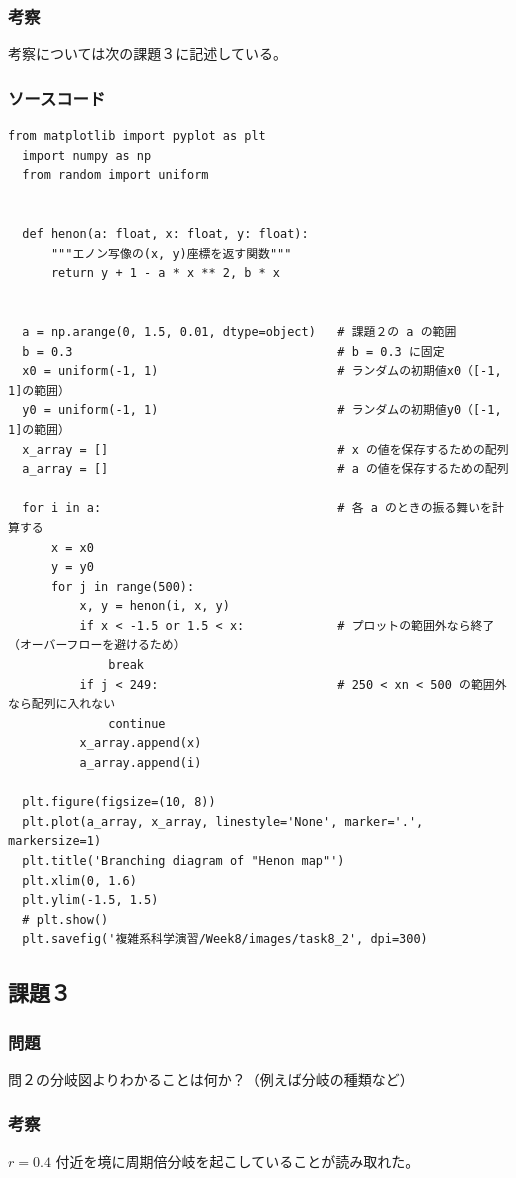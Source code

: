 \subsubsection{考察}
考察については次の課題３に記述している。

\subsubsection{ソースコード}
\begin{lstlisting}[caption=task8-2.py]
  from matplotlib import pyplot as plt
  import numpy as np
  from random import uniform


  def henon(a: float, x: float, y: float):
      """エノン写像の(x, y)座標を返す関数"""
      return y + 1 - a * x ** 2, b * x


  a = np.arange(0, 1.5, 0.01, dtype=object)   # 課題２の a の範囲
  b = 0.3                                     # b = 0.3 に固定
  x0 = uniform(-1, 1)                         # ランダムの初期値x0（[-1, 1]の範囲）
  y0 = uniform(-1, 1)                         # ランダムの初期値y0（[-1, 1]の範囲）
  x_array = []                                # x の値を保存するための配列
  a_array = []                                # a の値を保存するための配列

  for i in a:                                 # 各 a のときの振る舞いを計算する
      x = x0
      y = y0
      for j in range(500):
          x, y = henon(i, x, y)
          if x < -1.5 or 1.5 < x:             # プロットの範囲外なら終了（オーバーフローを避けるため）
              break
          if j < 249:                         # 250 < xn < 500 の範囲外なら配列に入れない
              continue
          x_array.append(x)
          a_array.append(i)

  plt.figure(figsize=(10, 8))
  plt.plot(a_array, x_array, linestyle='None', marker='.', markersize=1)
  plt.title('Branching diagram of "Henon map"')
  plt.xlim(0, 1.6)
  plt.ylim(-1.5, 1.5)
  # plt.show()
  plt.savefig('複雑系科学演習/Week8/images/task8_2', dpi=300)
\end{lstlisting}

\subsection{課題３}
\subsubsection{問題}
問２の分岐図よりわかることは何か？（例えば分岐の種類など）
\subsubsection{考察}
$r = 0.4$ 付近を境に周期倍分岐を起こしていることが読み取れた。